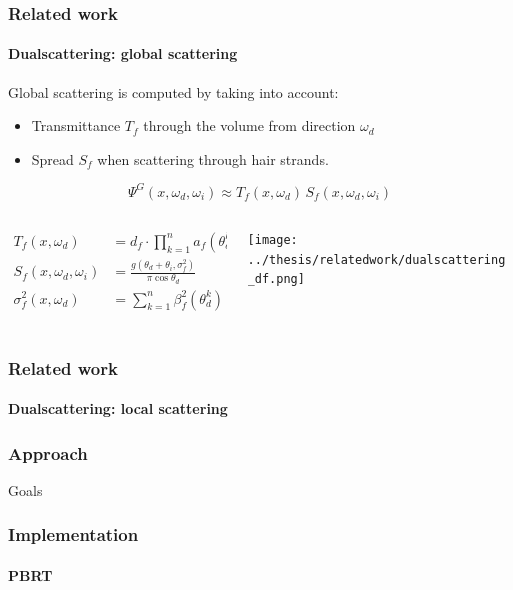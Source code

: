 \documentclass{beamer}
\begin{document}
  
    \begin{frame}
    \frametitle{Related work}
    \framesubtitle{Dualscattering: global scattering}
    
    Global scattering is computed by taking into account:
    
    \begin{itemize}
    \item Transmittance $T_f$ through the volume from direction $\omega_d$
    \item Spread $S_f$ when scattering through hair strands.
    \end{itemize}
    
    \begin{equation}
\Psi^G(x, \omega_d, \omega_i) \approx T_f(x, \omega_d)\,S_f(x, \omega_d, \omega_i)
\end{equation}

\begin{columns}
\begin{column}{0.4\textwidth}

\begin{align*}
T_f(x, \omega_d) &= d_f \cdot \prod_{k=1}^{n} a_f(\theta_d^k) \\
S_f(x, \omega_d, \omega_i) &= \frac{g(\theta_d + \theta_i, \sigma_f^2)}{\pi \cos \theta_d}  \\
\sigma_f^2(x, \omega_d) &= \sum_{k=1}^{n} \beta_f^2(\theta_d^k) \approx n \cdot \beta_f^2(\theta_d) \\
\end{align*}

\end{column}
\begin{column}{0.4\textwidth}
   \texttt{[image: ../thesis/relatedwork/dualscattering\_df.png]}
   \end{column}
   \end{columns}
  \end{frame}
  
   \begin{frame}
    \frametitle{Related work}
    \framesubtitle{Dualscattering: local scattering}
  \end{frame}
  
  \begin{frame}
    \frametitle{Approach}
	Goals
  \end{frame}
  
  
  \begin{frame}
    \frametitle{Implementation}
    \framesubtitle{PBRT}
  \end{frame}
  
\end{document}
